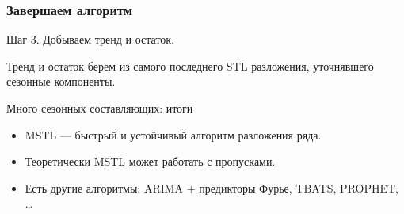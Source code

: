 \begin{frame}
  \frametitle{Завершаем алгоритм}

  Шаг 3. Добываем тренд и остаток. 

  \alert{Тренд} и \alert{остаток} берем из самого \alert{последнего} STL разложения, уточнявшего сезонные компоненты. 
  
\end{frame}


\begin{frame}{Много сезонных составляющих: итоги}

  \begin{itemize}[<+->]
    \item \alert{MSTL} — быстрый и устойчивый алгоритм разложения ряда.
    \item Теоретически \alert{MSTL} может работать с пропусками.
    \item Есть другие алгоритмы: ARIMA + предикторы Фурье, TBATS, PROPHET, \ldots
  \end{itemize}
\end{frame}

